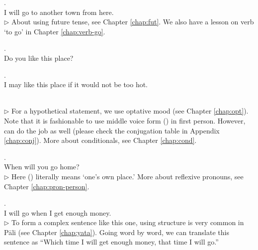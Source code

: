 \medskip
{}. \\
\hspace*{12mm}I will go to another town from here.\\
{\small $\triangleright$ About using future tense, see Chapter \ref{chap:fut}. We also have a lesson on verb `to go' in Chapter \ref{chap:verb-go}.}

\medskip
{}. \\
\hspace*{12mm}Do you like this place?\\

\medskip
\parbox[lt]{0.93\linewidth}{\raggedright{}. \\
\hspace*{6mm}I may like this place if it would not be too hot.}\\[1mm]
{\small $\triangleright$ For a hypothetical statement, we use optative mood (see Chapter \ref{chap:opt}). Note that it is fashionable to use middle voice form () in first person. However,  can do the job as well (please check the conjugation table in Appendix \ref{chap:conj}). More about conditionals, see Chapter \ref{chap:cond}.}

\medskip
{}. \\
\hspace*{12mm}When will you go home?\\
{\small $\triangleright$ Here  () literally means `one's own place.' More about reflexive pronouns, see Chapter \ref{chap:pron-person}.}

\medskip
{}. \\
\hspace*{12mm}I will go when I get enough money.\\
{\small $\triangleright$ To form a complex sentence like this one, using  structure is very common in P\=ali (see Chapter \ref{chap:yata}). Going word by word, we can translate this sentence as ``Which time I will get enough money, that time I will go.''}

